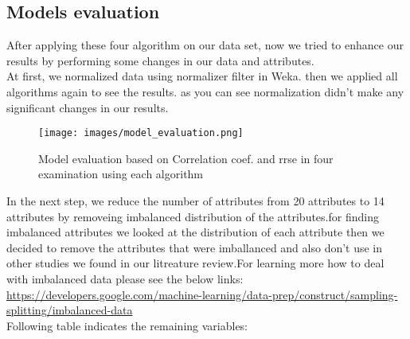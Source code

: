 \documentclass{article}
\begin{document}
\subsection{Models evaluation} 
After applying these four algorithm on our data set, now we tried to enhance our results by performing some changes in our data and attributes. \\
At first, we normalized data using normalizer filter in Weka. then we applied all algorithms again to see the results. as you can see normalization didn't make any significant changes in our results. \\ 
\begin{figure}[H]
\centering
    \texttt{[image: images/model\_evaluation.png]}
    \caption{Model evaluation based on Correlation coef. and rrse in four examination using each algorithm}
\end{figure} 
In the next step, we reduce the number of attributes from 20 attributes to 14 attributes by removeing imbalanced distribution of the attributes.for finding imbalanced attributes we looked at the distribution of each attribute then we decided to remove the attributes that were imballanced and also don't use in other studies we found in our litreature review.For learning more how to deal with imbalanced data please see the below links: \\
\url{https://developers.google.com/machine-learning/data-prep/construct/sampling-splitting/imbalanced-data} \\
Following table indicates the remaining variables: 
\end{document}
